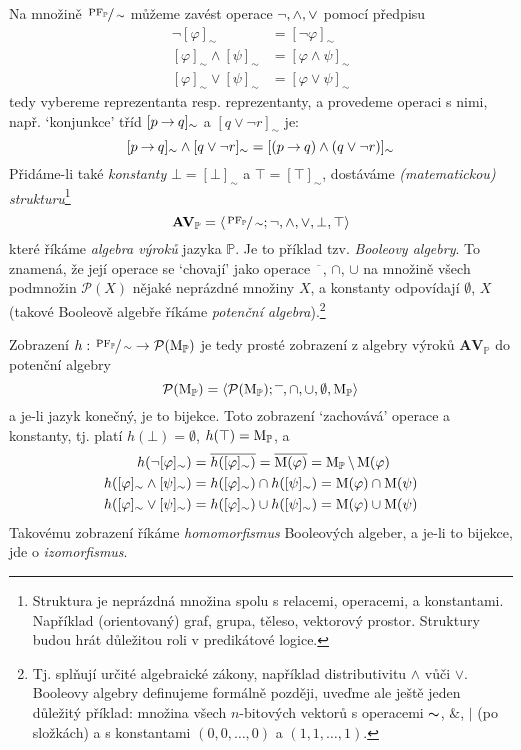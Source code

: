 Na množině $\sfrac{\operatorname{PF}_\mathbb P}{\sim}$ můžeme zavést operace $\neg,{\land},{\lor}$ pomocí předpisu
\begin{align*}
    \neg [\varphi]_\sim &=[\neg\varphi]_\sim\\
    [\varphi]_\sim \land [\psi]_\sim &= [\varphi\land\psi]_\sim\\
    [\varphi]_\sim \lor [\psi]_\sim &= [\varphi\lor\psi]_\sim
\end{align*}
tedy vybereme reprezentanta resp. reprezentanty, a provedeme operaci s nimi, např. `konjunkce' tříd $[p\mathbin{\rightarrow} q]_\sim$ a $[q\lor \neg r]_\sim$ je:
$$
[p\mathbin{\rightarrow} q]_\sim\land[q\lor \neg r]_\sim=[(p\mathbin{\rightarrow} q)\land (q\lor \neg r)]_\sim
$$
Přidáme-li také \emph{konstanty} $\bot=[\bot]_\sim$ a $\top=[\top]_\sim$, dostáváme \emph{(matematickou) strukturu}\footnote{Struktura je neprázdná množina spolu s relacemi, operacemi, a konstantami. Například (orientovaný) graf, grupa, těleso, vektorový prostor. Struktury budou hrát důležitou roli v predikátové logice.}
$$
\mathbf{AV}_\mathbb P=\langle \sfrac{\operatorname{PF}_\mathbb P}{\sim}; \neg, {\land}, {\lor}, \bot, \top\rangle
$$
které říkáme \emph{algebra výroků} jazyka $\mathbb P$. Je to příklad tzv. \emph{Booleovy algebry}. To znamená,  že její operace se `chovají' jako operace $\overline{\phantom{x}}$, $\cap$, $\cup$ na množině všech podmnožin $\mathcal P(X)$ nějaké neprázdné množiny $X$, a konstanty odpovídají $\emptyset$, $X$ (takové Booleově algebře říkáme \emph{potenční algebra}).\footnote{Tj. splňují určité algebraické zákony, například distributivitu $\land$ vůči $\lor$. Booleovy algebry definujeme formálně později, uveďme ale ještě jeden důležitý příklad: množina všech $n$-bitových vektorů s operacemi $\thicksim$, $\&$, $|$ (po složkách) a s konstantami $(0,0,\dots,0)$ a $(1,1,\dots,1)$.}

Zobrazení $h:\sfrac{\operatorname{PF}_\mathbb P}{\sim}\to\mathcal P(\operatorname{M}_\mathbb P)$ je tedy prosté zobrazení z algebry výroků $\mathbf{AV}_\mathbb P$ do potenční algebry
$$
\mathbf{\mathcal P(\operatorname{M}_\mathbb P)}=\langle \mathcal P(\operatorname{M}_\mathbb P); \overline{\phantom{x}}, \cap, \cup, \emptyset, \operatorname{M}_\mathbb P\rangle
$$
a je-li jazyk konečný, je to bijekce. Toto zobrazení `zachovává' operace a konstanty, tj. platí $h(\bot)=\emptyset$, $h(\top)=\operatorname{M}_\mathbb P$, a
\begin{align*}
    h(\neg[\varphi]_\sim)&=\overline{h([\varphi]_\sim)}=\overline{\operatorname{M}(\varphi)}=\operatorname{M}_\mathbb P\setminus\operatorname{M}(\varphi)\\
    h([\varphi]_\sim\land[\psi]_\sim)&=h([\varphi]_\sim)\cap h([\psi]_\sim)=\operatorname{M}(\varphi)\cap\operatorname{M}(\psi)\\
    h([\varphi]_\sim\lor[\psi]_\sim)&=h([\varphi]_\sim)\cup h([\psi]_\sim)=\operatorname{M}(\varphi)\cup\operatorname{M}(\psi)
\end{align*}
Takovému zobrazení říkáme \emph{homomorfismus} Booleových algeber, a je-li to bijekce, jde o \emph{izomorfismus}. 

